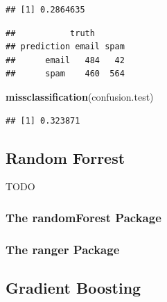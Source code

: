 \documentclass[]{book}
\newenvironment{Shaded}{\begin{snugshade}}{\end{snugshade}}
\newcommand{\KeywordTok}[1]{\textcolor[rgb]{0.13,0.29,0.53}{\textbf{#1}}}
\newcommand{\DataTypeTok}[1]{\textcolor[rgb]{0.13,0.29,0.53}{#1}}
\newcommand{\DecValTok}[1]{\textcolor[rgb]{0.00,0.00,0.81}{#1}}
\newcommand{\StringTok}[1]{\textcolor[rgb]{0.31,0.60,0.02}{#1}}
\newcommand{\CommentTok}[1]{\textcolor[rgb]{0.56,0.35,0.01}{\textit{#1}}}
\newcommand{\OperatorTok}[1]{\textcolor[rgb]{0.81,0.36,0.00}{\textbf{#1}}}
\newcommand{\NormalTok}[1]{#1}
\theoremstyle{definition}
\theoremstyle{definition}
\theoremstyle{definition}
\theoremstyle{remark}
\begin{document}
\begin{verbatim}
## [1] 0.2864635
\end{verbatim}

\begin{Shaded}
\end{Shaded}

\begin{verbatim}
##           truth
## prediction email spam
##      email   484   42
##      spam    460  564
\end{verbatim}

\begin{Shaded}
\begin{Highlighting}[]
\KeywordTok{missclassification}\NormalTok{(confusion.test)}
\end{Highlighting}
\end{Shaded}

\begin{verbatim}
## [1] 0.323871
\end{verbatim}

\subsection{Random Forrest}\label{random-forrest}

TODO

\subsubsection{The randomForest Package}\label{the-randomforest-package}

\subsubsection{The ranger Package}\label{the-ranger-package}

\subsection{Gradient Boosting}\label{gradient-boosting}
\end{document}
